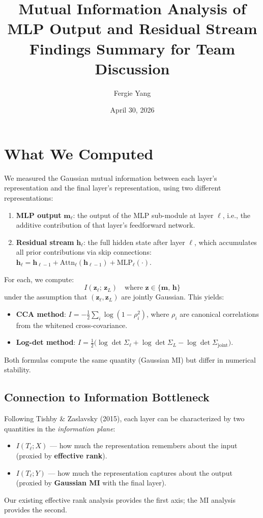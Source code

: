 \documentclass[11pt]{article}
\title{Mutual Information Analysis of MLP Output and Residual Stream\\
\large Findings Summary for Team Discussion}
\author{Fergie Yang}
\date{April 30, 2026}
\begin{document}
\maketitle

\section{What We Computed}

We measured the Gaussian mutual information between each layer's representation and the final layer's representation, using two different representations:

\begin{enumerate}
    \item \textbf{MLP output} $\mathbf{m}_\ell$: the output of the MLP sub-module at layer $\ell$, i.e., the additive contribution of that layer's feedforward network.
    \item \textbf{Residual stream} $\mathbf{h}_\ell$: the full hidden state after layer $\ell$, which accumulates all prior contributions via skip connections: $\mathbf{h}_\ell = \mathbf{h}_{\ell-1} + \text{Attn}_\ell(\mathbf{h}_{\ell-1}) + \text{MLP}_\ell(\cdot)$.
\end{enumerate}

For each, we compute:
\[
I(\mathbf{z}_\ell;\, \mathbf{z}_L) \quad \text{where } \mathbf{z} \in \{\mathbf{m},\, \mathbf{h}\}
\]
under the assumption that $(\mathbf{z}_\ell, \mathbf{z}_L)$ are jointly Gaussian. This yields:
\begin{itemize}
    \item \textbf{CCA method}: $I = -\frac{1}{2}\sum_i \log(1 - \rho_i^2)$, where $\rho_i$ are canonical correlations from the whitened cross-covariance.
    \item \textbf{Log-det method}: $I = \frac{1}{2}\bigl(\log\det\Sigma_\ell + \log\det\Sigma_L - \log\det\Sigma_{\text{joint}}\bigr)$.
\end{itemize}
Both formulas compute the same quantity (Gaussian MI) but differ in numerical stability.

\subsection{Connection to Information Bottleneck}

Following Tishby \& Zaslavsky (2015), each layer can be characterized by two quantities in the \emph{information plane}:
\begin{itemize}
    \item $I(T_\ell; X)$ --- how much the representation remembers about the input (proxied by \textbf{effective rank}).
    \item $I(T_\ell; Y)$ --- how much the representation captures about the output (proxied by \textbf{Gaussian MI} with the final layer).
\end{itemize}
Our existing effective rank analysis provides the first axis; the MI analysis provides the second.
\end{document}
